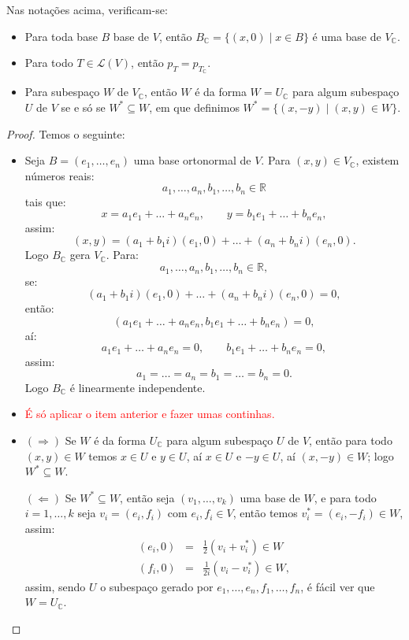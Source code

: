 \documentclass[11pt,twoside,a4paper]{book}
\begin{document}
\begin{proposicao}
Nas notações acima, verificam-se:
\begin{itemize}
\item Para toda base $B$ base de $V$, então $B_\mathbb{C}=\{(x,0)\mid x\in B\}$ é uma base de $V_\mathbb{C}$.
\item Para todo $T\in\mathcal{L}(V)$, então $p_T=p_{T_\mathbb{C}}$.
\item Para subespaço $W$ de $V_\mathbb{C}$, então $W$ é da forma $W=U_\mathbb{C}$ para algum subespaço $U$ de $V$ se e só se $W^*\subseteq W$, em que definimos $W^*=\{(x,-y)\mid(x,y)\in W\}$.
\end{itemize}
\end{proposicao}
\begin{proof}
Temos o seguinte:
\begin{itemize}
\item Seja $B=(e_1,\dots,e_n)$ uma base ortonormal de $V$. Para $(x,y)\in V_\mathbb{C}$, existem números reais:
\[
a_1,\dots,a_n,b_1,\dots,b_n\in\mathbb{R}
\]
tais que:
\[
x=a_1e_1+\dots+a_ne_n,\quad\quad y=b_1e_1+\dots+b_ne_n,
\]
assim:
\[
(x,y)=(a_1+b_1i)(e_1,0)+\dots+(a_n+b_ni)(e_n,0).
\]
Logo $B_\mathbb{C}$ gera $V_\mathbb{C}$. Para:
\[
a_1,\dots,a_n,b_1,\dots,b_n\in\mathbb{R},
\]
se:
\[
(a_1+b_1i)(e_1,0)+\dots+(a_n+b_ni)(e_n,0)=0,
\]
então:
\[
(a_1e_1+\dots+a_ne_n,b_1e_1+\dots+b_ne_n)=0,
\]
aí:
\[
a_1e_1+\dots+a_ne_n=0,\quad\quad b_1e_1+\dots+b_ne_n=0,
\]
assim:
\[
a_1=\dots=a_n=b_1=\dots=b_n=0.
\]
Logo $B_\mathbb{C}$ é linearmente independente.
\item \textcolor{red}{É só aplicar o item anterior e fazer umas continhas.}
\item $(\Rightarrow)$ Se $W$ é da forma $U_\mathbb{C}$ para algum subespaço $U$ de $V$, então para todo $(x,y)\in W$ temos $x\in U$ e $y\in U$, aí $x\in U$ e $-y\in U$, aí $(x,-y)\in W$; logo $W^*\subseteq W$.

\medskip
\noindent
$(\Leftarrow)$ Se $W^*\subseteq W$, então seja $(v_1,\dots,v_k)$ uma base de $W$, e para todo $i=1,\dots,k$ seja $v_i=(e_i,f_i)$ com $e_i,f_i\in V$, então temos $v_i^*=(e_i,-f_i)\in W$, assim:
\[
\begin{array}{rcl}
(e_i,0)&=&\frac{1}{2}(v_i+v_i^*)\in W\\
(f_i,0)&=&\frac{1}{2i}(v_i-v_i^*)\in W,
\end{array}
\]
assim, sendo $U$ o subespaço gerado por $e_1,\dots,e_n,f_1,\dots,f_n$, é fácil ver que $W=U_\mathbb{C}$.
\end{itemize}
\end{proof}
\end{document}
